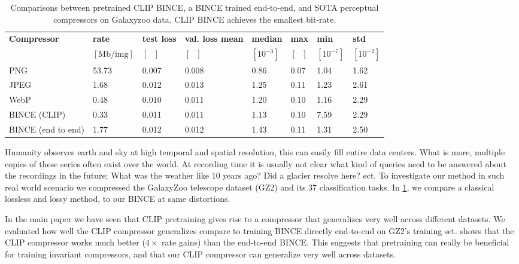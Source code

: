 \documentclass[final]{article}
\begin{document}
\begin{table}[ht]
\small
\caption{Comparisons between pretrained CLIP BINCE, a BINCE trained end-to-end, and SOTA perceptual compressors on Galaxyzoo data. 
CLIP BINCE achieves the smallest bit-rate.
}
\begin{tabular}{llllllll}
\toprule
\textbf{Compressor}           & \textbf{rate} & \textbf{test loss} & \textbf{val. loss mean} & \textbf{median}  &  \textbf{max} & \textbf{min}                   &  \textbf{std }                                                 \\
   &  $[\text{Mb/img}]$    & $[\text{ }]$ & $[\text{ }]$ &  $[10^{-3}]$ &  $[ \text{ }]$&  $[10^{-7}]$                  &  $[10^{-2}]$                                                            \\
\midrule
PNG              & 53.73 & 0.007   & 0.008       & 0.86        & 0.07                     & 1.04                     & 1.62   \\      
 JPEG              & 1.68 & 0.012   & 0.013        & 1.25         & 0.11                     & 1.23                     & 2.61    \\ 
 WebP              & 0.48  & 0.010  & 0.011        & 1.20         & 0.10                   & 1.16                     & 2.29       \\
\midrule
BINCE (CLIP) & 0.33  & 0.011    & 0.011        & 1.13         & 0.10                     & 7.59                     & 2.29   \\
BINCE (end to end)        & 1.77 & 0.012   & 0.012        & 1.43         & 0.11                     & 1.31                     & 2.50 \\
\bottomrule
\end{tabular}
\label{table:galaxy}
\end{table}

 
Humanity observes earth and sky at high temporal and spatial resolution, this can easily fill entire data centers. What is more, multiple copies of these series often exist over the world. 
At recording time it is usually not clear what kind of queries need to be answered about the recordings in the future; What was the weather like 10 years ago? Did a glacier resolve here? ect.  
To investigate our method in such real world scenario we compressed the GalaxyZoo telescope dataset (GZ2) and its 37 classification tasks.
In \cref{table:galaxy}, we compare a classical lossless and lossy method, to our BINCE at same distortions.


In the main paper we have seen that CLIP pretraining gives rise to a compressor that generalizes very well across different datasets.
We evaluated how well the CLIP compressor generalizes compare to training BINCE directly end-to-end on GZ2's training set.
 shows that the CLIP compressor works much better ($4\times$ rate gains) than the end-to-end BINCE.
This suggests that pretraining can really be beneficial for training invariant compressors, and that our CLIP compressor can generalize very well across datasets.
\end{document}
